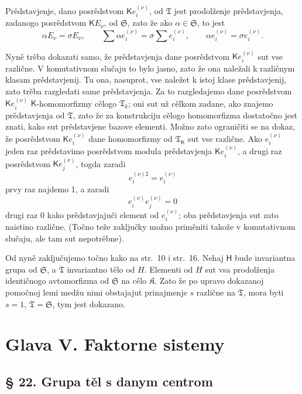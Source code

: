 \documentclass[11pt]{article}
\begin{document}
Prědstavjenje, dano posrědstvom \(\mathsf K e_i^{(\nu)}\), od \(\mathfrak T\) jest prodolženje prědstavjenja, zadanogo posrědstvom \(\mathsf K E_\nu\), od \(\mathfrak S\), zato že ako \(\alpha\in \mathfrak S\), to jest
\[
\alpha E_\nu=\sigma E_\nu,\qquad
\sum \alpha e_i^{(\nu)}=\sigma\sum e_i^{(\nu)},\qquad
\alpha e_i^{(\nu)}=\sigma e_i^{(\nu)}.
\]

Nyně trěba dokazati samo, že prědstavjenja dane posrědstvom \(\mathsf K e_i^{(\nu)}\) sut vse različne. V komutativnom slučaju to bylo jasno, zato že ona naležali k različnym klasam prědstavjenij. Tu ona, nasuprot, vse naležet k istoj klase prědstavjenij, zato trěba razgledati same prědstavjenja. Za to razgledajemo dane posrědstvom \(\mathsf K e_i^{(\nu)}\) \(\mathsf{K}\)-homomorfizmy cělogo \(\mathfrak T_k\); oni sut už cělkom zadane, ako znajemo prědstavjenja od \(\mathfrak T\), zato že za konstrukciju cělogo homomorfizma dostatočno jest znati, kako sut prědstavjene bazove elementi. Možno zato ograničiti se na dokaz, že posrědstvom \(\mathsf K e_i^{(\nu)}\) dane homomorfizmy od \(\mathfrak T_{\mathsf{K}}\) sut vse različne. Ako \(e_i^{(\nu)}\) jeden raz prědstavimo posrědstvom modula prědstavjenja \(\mathsf K e_i^{(\nu)}\), a drugi raz posrědstvom \(\mathsf K e_j^{(\nu)}\), togda zaradi
\[
e_i^{(\nu)2}=e_i^{(\nu)}
\]
prvy raz najdemo 1, a zaradi
\[
e_i^{(\nu)}e_j^{(\nu)}=0
\]
drugi raz 0 kako prědstavjajuči element od \(e_i^{(\nu)}\); oba prědstavjenja sut zato naistino različne. (Točno teže zaključky možno priměniti takože v komutativnom slučaju, ale tam sut nepotrěbne).

Od nyně zaključujemo točno kako na str.~10 i str.~16. Nehaj \(\mathsf{H}\) bude invariantna grupa od \(\mathfrak S\), a \(\mathfrak T\) invariantno tělo od \(H\). Elementi od \(H\) sut vsa prodolženja identičnogo avtomorfizma od \(\mathfrak S\) na cělo \(\mathfrak K\). Zato že po upravo dokazanoj pomočnoj lemi medžu nimi obstajajut prinajmenje \(s\) različne na \(\mathfrak T\), mora byti \(s=1\), \(\mathfrak T=\mathfrak S\), tym jest dokazano.

\section*{Glava V. Faktorne sistemy}\label{kapitel-v.-faktorensysteme}

\subsection*{§ 22. Grupa těl s danym centrom}\label{die-gruppe-der-koerper-mit-gegebenem-zentrum}
\end{document}
